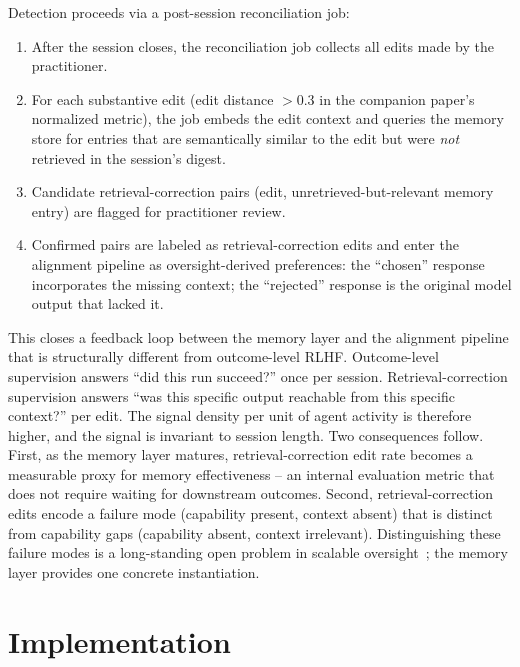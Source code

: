 \documentclass[11pt]{article}
\begin{document}
Detection proceeds via a post-session reconciliation job:

\begin{enumerate}[leftmargin=*, nosep]
  \item After the session closes, the reconciliation job collects all edits made by the practitioner.
  \item For each substantive edit (edit distance $> 0.3$ in the companion paper's normalized metric), the job embeds the edit context and queries the memory store for entries that are semantically similar to the edit but were \emph{not} retrieved in the session's digest.
  \item Candidate retrieval-correction pairs (edit, unretrieved-but-relevant memory entry) are flagged for practitioner review.
  \item Confirmed pairs are labeled as retrieval-correction edits and enter the alignment pipeline as oversight-derived preferences: the ``chosen'' response incorporates the missing context; the ``rejected'' response is the original model output that lacked it.
\end{enumerate}

This closes a feedback loop between the memory layer and the alignment pipeline that is structurally different from outcome-level RLHF.
Outcome-level supervision answers ``did this run succeed?'' once per session.
Retrieval-correction supervision answers ``was this specific output reachable from this specific context?'' per edit.
The signal density per unit of agent activity is therefore higher, and the signal is invariant to session length.
Two consequences follow.
First, as the memory layer matures, retrieval-correction edit rate becomes a measurable proxy for memory effectiveness -- an internal evaluation metric that does not require waiting for downstream outcomes.
Second, retrieval-correction edits encode a failure mode (capability present, context absent) that is distinct from capability gaps (capability absent, context irrelevant).
Distinguishing these failure modes is a long-standing open problem in scalable oversight~\citep{bowman2022scalable}; the memory layer provides one concrete instantiation.


\section{Implementation}
\label{sec:implementation}
\end{document}
